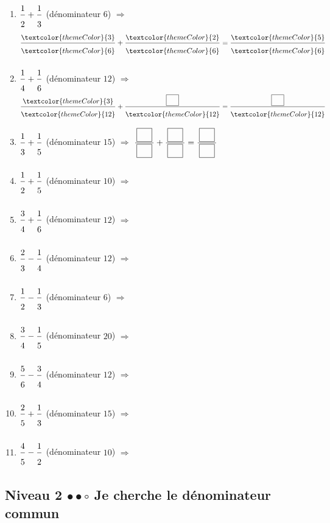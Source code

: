 \begin{enumerate}[leftmargin=*,align=parleft, label=\alph*), itemsep=9pt]
\item $\FA{1}{2}+\FA{1}{3}$ \quad (dénominateur $6$) \quad $\Longrightarrow$ \quad $\FA{\textcolor{themeColor}{3}}{\textcolor{themeColor}{6}}+\FA{\textcolor{themeColor}{2}}{\textcolor{themeColor}{6}}=\FA{\textcolor{themeColor}{5}}{\textcolor{themeColor}{6}}$
\item $\FA{1}{4}+\FA{1}{6}$ \quad (dénominateur $12$) \quad $\Longrightarrow$ \quad $\FA{\textcolor{themeColor}{3}}{\textcolor{themeColor}{12}}+\FA{\CaseC}{\textcolor{themeColor}{12}}=\FA{\CaseC}{\textcolor{themeColor}{12}}$
\item $\FA{1}{3}+\FA{1}{5}$ \quad (dénominateur $15$) \quad $\Longrightarrow$ \quad $\FA{\CaseC}{\CaseC}+\FA{\CaseC}{\CaseC}=\FA{\CaseC}{\CaseC}$
\item $\FA{1}{2}+\FA{1}{5}$ \quad (dénominateur $10$) \quad $\Longrightarrow$
\item $\FA{3}{4}+\FA{1}{6}$ \quad (dénominateur $12$) \quad $\Longrightarrow$
\item $\FA{2}{3}-\FA{1}{4}$ \quad (dénominateur $12$) \quad $\Longrightarrow$
\item $\FA{1}{2}-\FA{1}{3}$ \quad (dénominateur $6$) \quad $\Longrightarrow$
\item $\FA{3}{4}-\FA{1}{5}$ \quad (dénominateur $20$) \quad $\Longrightarrow$
\item $\FA{5}{6}-\FA{3}{4}$ \quad (dénominateur $12$) \quad $\Longrightarrow$
\item $\FA{2}{5}+\FA{1}{3}$ \quad (dénominateur $15$) \quad $\Longrightarrow$
\item $\FA{4}{5}-\FA{1}{2}$ \quad (dénominateur $10$) \quad $\Longrightarrow$
\end{enumerate}
 
\newpage
\subsection{Niveau 2 \quad $\bullet\bullet\circ$ \quad Je cherche le dénominateur commun}
 
 
